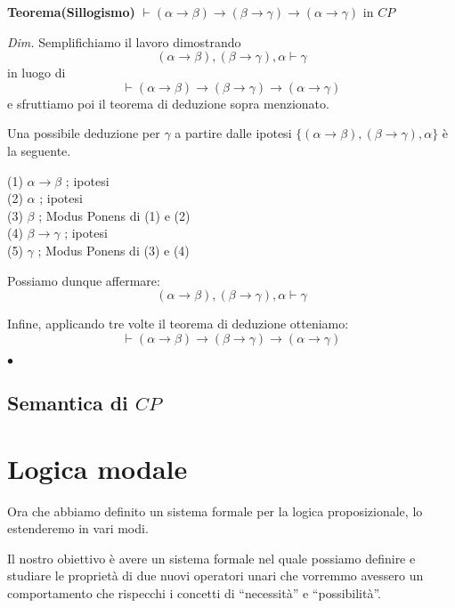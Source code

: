 \documentclass[a4paper, 12pt]{article}
\begin{document}
\begin{flushleft}
\textbf{Teorema(Sillogismo)}
$\vdash (\alpha \rightarrow \beta) \rightarrow
        (\beta \rightarrow \gamma) \rightarrow (\alpha \rightarrow \gamma)$ in $CP$

\textit{Dim.}
Semplifichiamo il lavoro dimostrando
$$(\alpha \rightarrow \beta),(\beta \rightarrow \gamma),\alpha \vdash \gamma$$
in luogo di
$$\vdash (\alpha \rightarrow \beta) \rightarrow
        (\beta \rightarrow \gamma) \rightarrow (\alpha \rightarrow \gamma)$$
e sfruttiamo poi il teorema di deduzione sopra menzionato.

Una possibile deduzione per $\gamma$ a partire dalle ipotesi
$\{(\alpha \rightarrow \beta),(\beta \rightarrow \gamma),\alpha\}$ è la seguente.

(1) $\alpha \rightarrow \beta$ ; ipotesi \\
(2) $\alpha$ ; ipotesi \\
(3) $\beta$ ; Modus Ponens di (1) e (2) \\
(4) $\beta \rightarrow \gamma$ ; ipotesi \\
(5) $\gamma$ ; Modus Ponens di (3) e (4)

Possiamo dunque affermare:
$$(\alpha \rightarrow \beta),(\beta \rightarrow \gamma),\alpha \vdash \gamma$$

Infine, applicando tre volte il teorema di deduzione otteniamo:
$$\vdash (\alpha \rightarrow \beta) \rightarrow (\beta \rightarrow \gamma) \rightarrow (\alpha \rightarrow \gamma)$$

\begin{flushright}
$\bullet$
\end{flushright}
\end{flushleft}

\subsection{Semantica di $CP$}

\section{Logica modale}
Ora che abbiamo definito un sistema formale per la logica proposizionale,
lo estenderemo in vari modi.

Il nostro obiettivo è avere un sistema formale nel quale possiamo definire e studiare
le proprietà di due nuovi operatori unari che vorremmo avessero un comportamento che rispecchi
i concetti di ``necessità'' e ``possibilità''.
\end{document}
